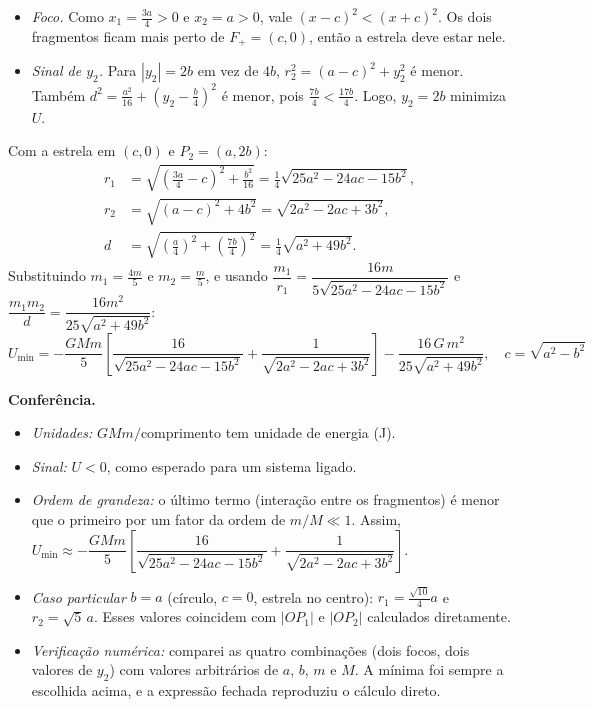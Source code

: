 \documentclass{article}%
\begin{document}
\begin{itemize}
\item \emph{Foco.} Como $x_1=\tfrac{3a}{4}>0$ e $x_2=a>0$, vale $(x-c)^2<(x+c)^2$. Os dois fragmentos ficam mais perto de $F_+=(c,0)$, então a estrela deve estar nele.
\item \emph{Sinal de $y_2$.} Para $|y_2|=2b$ em vez de $4b$, $r_2^2=(a-c)^2+y_2^2$ é menor. Também $d^2=\tfrac{a^2}{16}+\left(y_2-\tfrac b4\right)^2$ é menor, pois $\tfrac{7b}{4}<\tfrac{17b}{4}$. Logo, $y_2=2b$ minimiza $U$.
\end{itemize}

Com a estrela em $(c,0)$ e $P_2=(a,2b)$:
\begin{align*}
r_1&=\sqrt{\left(\tfrac{3a}{4}-c\right)^2+\tfrac{b^2}{16}}=\tfrac14\sqrt{25a^2-24ac-15b^2},\\
r_2&=\sqrt{(a-c)^2+4b^2}=\sqrt{2a^2-2ac+3b^2},\\
d&=\sqrt{\left(\tfrac a4\right)^2+\left(\tfrac{7b}{4}\right)^2}=\tfrac14\sqrt{a^2+49b^2}.
\end{align*}
Substituindo $m_1=\tfrac{4m}{5}$ e $m_2=\tfrac m5$, e usando $\dfrac{m_1}{r_1}=\dfrac{16m}{5\sqrt{25a^2-24ac-15b^2}}$ e $\dfrac{m_1m_2}{d}=\dfrac{16m^2}{25\sqrt{a^2+49b^2}}$:
\[
\boxed{U_{\min}=-\frac{GMm}{5}\left[\frac{16}{\sqrt{25a^2-24ac-15b^2}}+\frac{1}{\sqrt{2a^2-2ac+3b^2}}\right]-\frac{16\,G\,m^2}{25\sqrt{a^2+49b^2}},\quad c=\sqrt{a^2-b^2}}
\]

\textbf{Conferência.}
\begin{itemize}
\item \emph{Unidades:} $GMm/\text{comprimento}$ tem unidade de energia (J).
\item \emph{Sinal:} $U<0$, como esperado para um sistema ligado.
\item \emph{Ordem de grandeza:} o último termo (interação entre os fragmentos) é menor que o primeiro por um fator da ordem de $m/M\ll1$. Assim, $U_{\min}\approx-\dfrac{GMm}{5}\left[\dfrac{16}{\sqrt{25a^2-24ac-15b^2}}+\dfrac{1}{\sqrt{2a^2-2ac+3b^2}}\right]$.
\item \emph{Caso particular} $b=a$ (círculo, $c=0$, estrela no centro): $r_1=\tfrac{\sqrt{10}}{4}a$ e $r_2=\sqrt5\,a$. Esses valores coincidem com $|OP_1|$ e $|OP_2|$ calculados diretamente.
\item \emph{Verificação numérica:} comparei as quatro combinações (dois focos, dois valores de $y_2$) com valores arbitrários de $a$, $b$, $m$ e $M$. A mínima foi sempre a escolhida acima, e a expressão fechada reproduziu o cálculo direto.
\end{itemize}
\end{document}
